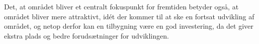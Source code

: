 \newline \indent{     }  Det, at området bliver et centralt fokuspunkt for fremtiden betyder også, at området bliver mere attraktivt, idét der kommer til at ske en fortsat udvikling af området, og netop derfor kan en tilbygning være en god investering, da det giver ekstra plads og bedre forudsætninger for udviklingen.
